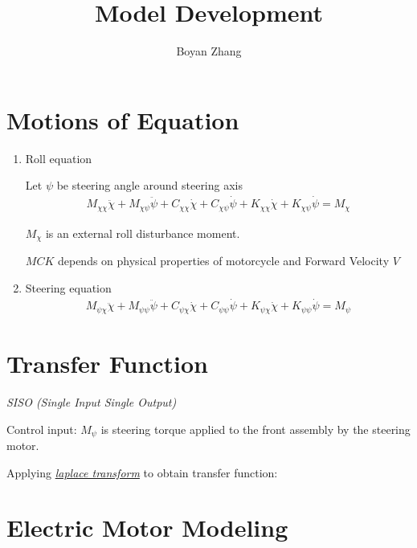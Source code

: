 \documentclass[11pt]{article}
\begin{document}
\author{Boyan Zhang}
\title{Model Development}
\maketitle

\section{Motions of Equation}

\begin{enumerate}

\item %
Roll equation

Let $\psi$ be steering angle around steering axis
\begin{align}
    M_{\chi\chi} \ddot{\chi} + M_{\chi\psi} \ddot{\psi} + C_{\chi\chi} \dot{\chi} + C_{\chi\psi} \dot{\psi} + K_{\chi\chi} \dot{\chi} + K_{\chi\psi} \dot{\psi} = M_{\chi}
\end{align}

$M_{\chi}$ is an external roll disturbance moment.

$M C K$ depends on physical properties of motorcycle and Forward Velocity $V$

\item
Steering equation
\begin{align}
    M_{\psi\chi} \ddot{\chi} + M_{\psi\psi} \ddot{\psi} + C_{\psi\chi} \dot{\chi} + C_{\psi\psi} \dot{\psi} + K_{\psi\chi} \dot{\chi} + K_{\psi\psi} \dot{\psi} = M_{\psi}
\end{align}

\end{enumerate}

\section{Transfer Function}

{\em SISO (Single Input Single Output)}

Control input:
$M_{\psi}$ is steering torque applied to the front assembly by the steering motor.

Applying {\em \href{http://tutorial.math.lamar.edu/pdf/Laplace_Table.pdf}{laplace transform}} to obtain transfer function:

\section{Electric Motor Modeling}
\end{document}
